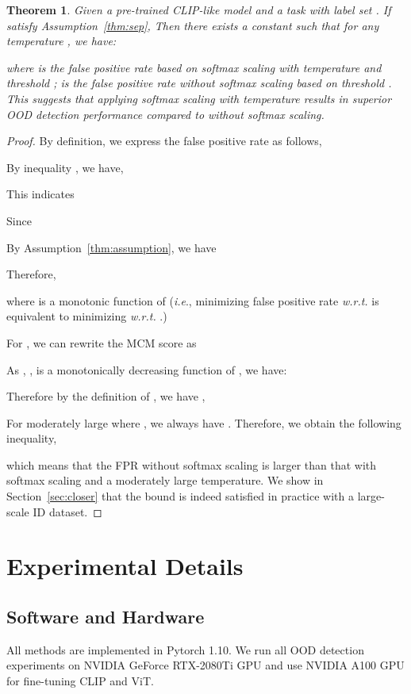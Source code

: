 \documentclass{article}
\newtheorem{theorem}{Theorem}[section]
\def\ie{\emph{i.e}., }
\begin{document}
\begin{theorem}
Given a pre-trained CLIP-like model  and a task with label set . If  satisfy Assumption~\ref{thm:sep}, Then there exists a constant  such that for any temperature ,
we have:

where  is the false positive rate based on softmax scaling with temperature  and threshold ;  is the false positive rate without softmax scaling based on threshold . This suggests that applying softmax scaling with temperature results in superior OOD detection performance compared to without softmax scaling. 
\end{theorem}
\begin{proof}


By definition, we express the false positive rate  as follows,


By inequality , we have,

This indicates

Since

By Assumption~\ref{thm:assumption}, we have

Therefore,

where  is a monotonic function of  (\ie minimizing false positive rate \emph{w.r.t.}  is equivalent to minimizing \emph{w.r.t.}  .)

For , we can rewrite the MCM score as 

As , ,   is a monotonically decreasing function of , we have: 

Therefore by the definition of , we have , 

For moderately large  where ,  we always have . Therefore, we obtain the following inequality,

which means that the FPR without softmax scaling is  larger than that with softmax scaling and a moderately large temperature. We show in Section~\ref{sec:closer} that the bound is indeed satisfied in practice with a large-scale ID dataset.
\end{proof}
\newpage
\section{Experimental Details}
\label{sec:exp_detail}

\subsection{Software and Hardware}
All methods are implemented in Pytorch 1.10. We run all OOD detection experiments on NVIDIA GeForce RTX-2080Ti GPU and use NVIDIA A100 GPU for fine-tuning CLIP and ViT.
\end{document}
